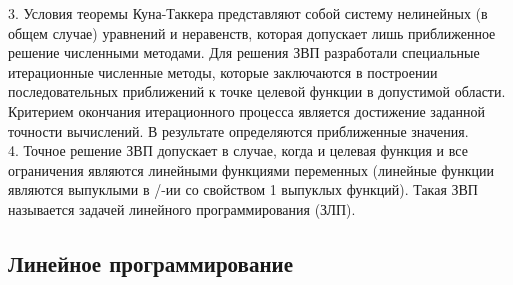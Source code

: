 \documentclass[a4paper]{article}
\begin{document}
3. Условия теоремы Куна-Таккера представляют собой систему нелинейных (в общем случае) уравнений и неравенств, которая допускает лишь приближенное решение численными методами. Для решения ЗВП разработали специальные итерационные численные методы, которые заключаются в построении последовательных приближений к точке целевой функции в допустимой области. Критерием окончания итерационного процесса является достижение заданной точности вычислений. В результате определяются приближенные значения. \\

4. Точное решение ЗВП допускает в случае, когда и целевая функция и все ограничения являются линейными функциями переменных (линейные функции являются выпуклыми в /-ии со свойством 1 выпуклых функций). Такая ЗВП называется задачей линейного программирования (ЗЛП).

\subsection*{Линейное программирование}
\end{document}
